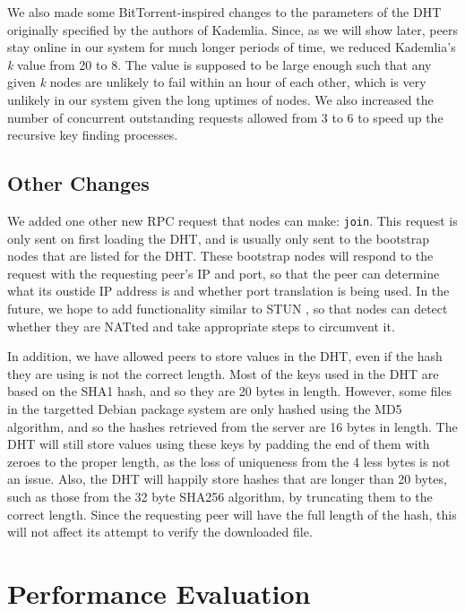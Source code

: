 \documentclass[conference]{IEEEtran}
\begin{document}
We also made some BitTorrent-inspired changes to the parameters of
the DHT originally specified by the authors of Kademlia. Since, as
we will show later, peers stay online in our system for much longer
periods of time, we reduced Kademlia's \emph{k} value from 20 to 8.
The value is supposed to be large enough such that any given
\emph{k} nodes are unlikely to fail within an hour of each other,
which is very unlikely in our system given the long uptimes of
nodes. We also increased the number of concurrent outstanding
requests allowed from 3 to 6 to speed up the recursive key finding
processes.

\subsection{Other Changes}
\label{other_changes}

We added one other new RPC request that nodes can make:
\texttt{join}. This request is only sent on first loading the DHT,
and is usually only sent to the bootstrap nodes that are listed for
the DHT. These bootstrap nodes will respond to the request with the
requesting peer's IP and port, so that the peer can determine what
its oustide IP address is and whether port translation is being
used. In the future, we hope to add functionality similar to STUN
\cite{STUN}, so that nodes can detect whether they are NATted and
take appropriate steps to circumvent it.

In addition, we have allowed peers to store values in the DHT, even
if the hash they are using is not the correct length. Most of the
keys used in the DHT are based on the SHA1 hash, and so they are 20
bytes in length. However, some files in the targetted Debian package
system are only hashed using the MD5 algorithm, and so the hashes
retrieved from the server are 16 bytes in length. The DHT will still
store values using these keys by padding the end of them with zeroes
to the proper length, as the loss of uniqueness from the 4 less
bytes is not an issue. Also, the DHT will happily store hashes that
are longer than 20 bytes, such as those from the 32 byte SHA256
algorithm, by truncating them to the correct length. Since the
requesting peer will have the full length of the hash, this will not
affect its attempt to verify the downloaded file.


\section{Performance Evaluation}
\label{analysis}
\end{document}
